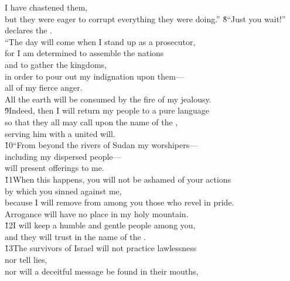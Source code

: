 \begin{poetry}
\poeml I have chastened them, \\
\poemll    but they were eager to corrupt everything they were doing.''
\poeml \v{8}``Just you wait!'' declares the . \\
\poemll    ``The day will come when I stand up as a prosecutor, \\
\poeml for I am determined to assemble the nations \\
\poemll    and to gather the kingdoms, \\
\poeml in order to pour out my indignation upon them--- \\
\poemll    all of my fierce anger. \\
\poeml All the earth will be consumed by the fire of my jealousy. \\
\poeml \v{9}Indeed, then I will return my people to a pure language \\
\poemll    so that they all may call upon the name of the , \\
\poemlll       serving him with a united will. \\
\poeml \v{10}``From beyond the rivers of Sudan my worshipers--- \\
\poemll    including my dispersed people--- \\
\poemlll       will present offerings to me. \\
\poeml \v{11}When this happens, you will not be ashamed of your actions \\
\poemll    by which you sinned against me, \\
\poeml because I will remove from among you those who revel in pride. \\
\poemll    Arrogance will have no place in my holy mountain. \\
\poeml \v{12}I will keep a humble and gentle people among you, \\
\poemll    and they will trust in the name of the . \\
\poeml \v{13}The survivors of Israel will not practice lawlessness \\
\poemll    nor tell lies, \\
\poeml nor will a deceitful message be found in their mouths, \\

\end{poetry}
